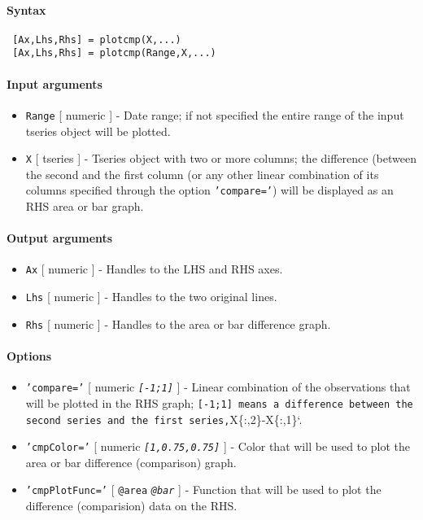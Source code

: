 


	\paragraph{Syntax}
 
 \begin{verbatim}
 [Ax,Lhs,Rhs] = plotcmp(X,...)
 [Ax,Lhs,Rhs] = plotcmp(Range,X,...)
 \end{verbatim}
 
 \paragraph{Input arguments}
 
 \begin{itemize}
 \item
   \texttt{Range} {[} numeric {]} - Date range; if not specified the
   entire range of the input tseries object will be plotted.
 \item
   \texttt{X} {[} tseries {]} - Tseries object with two or more columns;
   the difference (between the second and the first column (or any other
   linear combination of its columns specified through the option
   \texttt{'compare='}) will be displayed as an RHS area or bar graph.
 \end{itemize}
 
 \paragraph{Output arguments}
 
 \begin{itemize}
 \item
   \texttt{Ax} {[} numeric {]} - Handles to the LHS and RHS axes.
 \item
   \texttt{Lhs} {[} numeric {]} - Handles to the two original lines.
 \item
   \texttt{Rhs} {[} numeric {]} - Handles to the area or bar difference
   graph.
 \end{itemize}
 
 \paragraph{Options}
 
 \begin{itemize}
 \item
   \texttt{'compare='} {[} numeric \textbar{} \emph{\texttt{{[}-1;1{]}}}
   {]} - Linear combination of the observations that will be plotted in
   the RHS graph;
   \texttt{{[}-1;1{]} means a difference between the second series and the first series,}X\{:,2\}-X\{:,1\}`.
 \item
   \texttt{'cmpColor='} {[} numeric \textbar{}
   \emph{\texttt{{[}1,0.75,0.75{]}}} {]} - Color that will be used to
   plot the area or bar difference (comparison) graph.
 \item
   \texttt{'cmpPlotFunc='} {[} \texttt{@area} \textbar{}
   \emph{\texttt{@bar}} {]} - Function that will be used to plot the
   difference (comparision) data on the RHS.
 \end{itemize}
 
